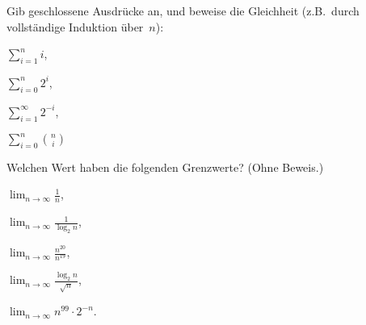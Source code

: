 \documentclass{uebung_cs}
\begin{document}
\begin{aufgabe}[Summen]
    Gib geschlossene Ausdrücke an, und beweise die Gleichheit (z.B.~durch vollständige Induktion über~$n$):\quad
    \begin{enumerate*}
        \item $\sum_{i=1}^n i$,\;
        \item $\sum_{i=0}^n 2^{i}$,\;
        \item $\sum_{i=1}^\infty 2^{-i}$,\;
        \item $\sum_{i=0}^n \binom{n}{i}$
    \end{enumerate*}
\end{aufgabe}

\begin{aufgabe}[Grenzwerte]
    Welchen Wert haben die folgenden Grenzwerte? (Ohne Beweis.)
    \begin{enumerate*}
        \item $\lim_{n\to\infty} \tfrac1{n}$,\;
        \item $\lim_{n\to\infty} \tfrac1{\log_2 n}$,\;
        \item $\lim_{n\to\infty} \tfrac{n^{20}}{n^{19}}$,\;
        \item $\lim_{n\to\infty} \tfrac{\log_2 n}{\sqrt{n}}$,\;
        \item $\lim_{n\to\infty} n^{99} \cdot 2^{-n}$.
    \end{enumerate*}
\end{aufgabe}
\end{document}
